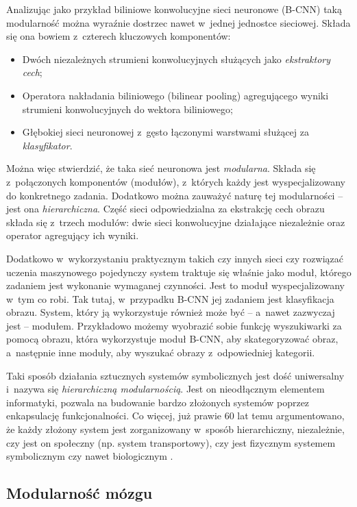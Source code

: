 Analizując jako przykład biliniowe konwolucyjne sieci neuronowe (B-CNN) \cite{lin2015bilinear} taką modularność można wyraźnie dostrzec nawet w~jednej jednostce sieciowej.
Składa się ona bowiem z~czterech kluczowych komponentów:
\begin{itemize}
	\item Dwóch niezależnych strumieni konwolucyjnych służących jako \emph{ekstraktory cech};
	\item Operatora nakładania biliniowego (bilinear pooling) agregującego wyniki strumieni konwolucyjnych do wektora biliniowego;
	\item Głębokiej sieci neuronowej z~gęsto łączonymi warstwami służącej za \emph{klasyfikator}.
\end{itemize}
Można więc stwierdzić, że taka sieć neuronowa jest \emph{modularna}. Składa się z~połączonych komponentów (modułów), z~których każdy jest wyspecjalizowany do konkretnego zadania.
Dodatkowo można zauważyć naturę tej modularności -- jest ona \emph{hierarchiczna}.
Część sieci odpowiedzialna za ekstrakcję cech obrazu składa się z~trzech modułów: dwie sieci konwolucyjne działające niezależnie oraz operator agregujący ich wyniki.

Dodatkowo w~wykorzystaniu praktycznym takich czy innych sieci czy rozwiązać uczenia maszynowego pojedynczy system traktuje się właśnie jako moduł, którego zadaniem jest wykonanie wymaganej czynności.
Jest to moduł wyspecjalizowany w~tym co robi.
Tak tutaj, w~przypadku B-CNN jej zadaniem jest klasyfikacja obrazu.
System, który ją wykorzystuje również może być -- a~nawet zazwyczaj jest -- modułem.
Przykładowo możemy wyobrazić sobie funkcję wyszukiwarki za pomocą obrazu, która wykorzystuje moduł B-CNN, aby skategoryzować obraz, a~następnie inne moduły, aby wyszukać obrazy z~odpowiedniej kategorii.

Taki sposób działania sztucznych systemów symbolicznych jest dość uniwersalny i~nazywa się \emph{hierarchiczną modularnością}.
Jest on nieodłącznym elementem informatyki, pozwala na budowanie bardzo złożonych systemów poprzez enkapsulację funkcjonalności.
Co więcej, już prawie 60 lat temu argumentowano, że każdy złożony system jest zorganizowany w~sposób hierarchiczny, niezależnie, czy jest on społeczny (np. system transportowy), czy jest fizycznym systemem symbolicznym czy nawet biologicznym \cite{simon1962architecture}.

\subsection{Modularność mózgu}

